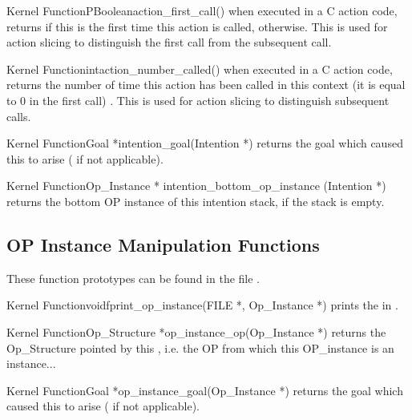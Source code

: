 \begin{typefn}{Kernel Function}{PBoolean}{action\_first\_call}{()}
when executed in a C action code, returns  if this is the first time
this action is called,  otherwise. This is used for action slicing
to distinguish the first call from the subsequent call.
\end{typefn}

\begin{typefn}{Kernel Function}{int}{action\_number\_called}{()}
when executed in a C action code, returns the number of time this action has
been called in this context (it is equal to 0 in the first call) . This is used
for action slicing to distinguish subsequent calls.
\end{typefn}

\begin{typefn}{Kernel Function}{Goal *}{intention\_goal}{(Intention
*)} 
returns the goal which caused this  to arise
( if not applicable).
\end{typefn}

\begin{typefn}{Kernel Function}{Op\_Instance *} {intention\_bottom\_op\_instance}
{(Intention *)}
returns the bottom OP instance of this intention stack,
 if the stack is empty.
\end{typefn}

\subsection{OP Instance Manipulation Functions}

These function prototypes can be found in the file
.

\begin{typefn}{Kernel Function}{void}{fprint\_op\_instance}{(FILE *,
Op\_Instance *)}
prints the  in .
\end{typefn}

\begin{typefn}{Kernel Function}{Op\_Structure *}{op\_instance\_op}{(Op\_Instance
*)}
returns the Op\_Structure pointed by this , i.e. the OP from
which this OP\_instance is an instance...
\end{typefn}

\begin{typefn}{Kernel Function}{Goal *}{op\_instance\_goal}{(Op\_Instance
*)}
returns the goal which caused this  to arise
( if not applicable).
\end{typefn}

